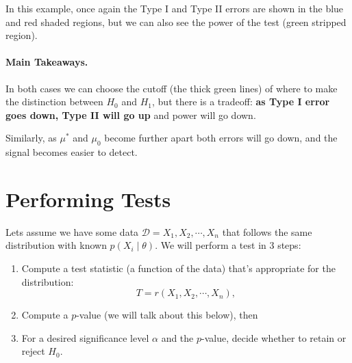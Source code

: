 \begin{center}
\end{center}

In this example, once again the Type I and Type II errors are shown in the blue and red shaded regions, 
but we can also see the power of the test (green stripped region). 

\paragraph{Main Takeaways. }
In both cases we can choose the cutoff (the thick green lines) of where to make the distinction between $H_0$ and $H_1$, 
but there is a tradeoff: 
\textbf{as Type I error goes down, Type II will go up} and power will go down. 

Similarly, as $\mu^*$ and $\mu_0$ become further apart both errors will go down, and the signal becomes easier to detect. 

\section{Performing Tests}

Lets assume we have some data $\mathcal{D} = X_1,X_2,\cdots,X_n$ that follows the same distribution with known $p(X_i\mid\theta)$.
We will perform a test in 3 steps:
\begin{enumerate}
\item Compute a test statistic (a function of the data) that's appropriate for the distribution: \[T = r(X_1,X_2,\cdots,X_n),\]
\item Compute a $p$-value (we will talk about this below), then 
\item For a desired significance level $\alpha$ and the $p$-value, decide whether to retain or reject $H_0$. 
\end{enumerate}

